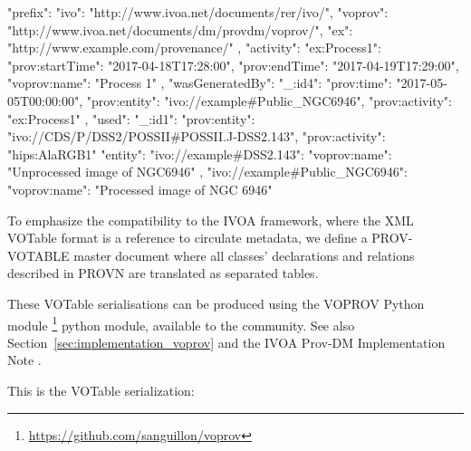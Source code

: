 
\begin{verbnobox}[\scriptsize]
{
  "prefix": {
    "ivo": "http://www.ivoa.net/documents/rer/ivo/",
    "voprov": "http://www.ivoa.net/documents/dm/provdm/voprov/",
    "ex": "http://www.example.com/provenance/"
  },
  "activity": {
    "ex:Process1": {
      "prov:startTime": "2017-04-18T17:28:00",
      "prov:endTime": "2017-04-19T17:29:00",
      "voprov:name": "Process 1"
    }
  },
  "wasGeneratedBy": {
    "_:id4": {
      "prov:time": "2017-05-05T00:00:00",
      "prov:entity": "ivo://example#Public_NGC6946",
      "prov:activity": "ex:Process1"
    }
  },
  "used": {
    "_:id1": {
      "prov:entity": "ivo://CDS/P/DSS2/POSSII#POSSII.J-DSS2.143",
      "prov:activity": "hips:AlaRGB1"
    }
  }
  "entity": {
    "ivo://example#DSS2.143": {
      "voprov:name": "Unprocessed image of NGC6946"
    },
    "ivo://example#Public_NGC6946": {
      "voprov:name": "Processed image of NGC 6946"
    }
  }
}
\end{verbnobox}
To emphasize the compatibility to the IVOA framework, where the XML VOTable format is a reference to circulate metadata, we define a PROV-VOTABLE master document where all classes' declarations and relations described in PROV\-N are translated as separated tables.

These VOTable serialisations can be produced  using  the VOPROV Python module  \footnote{\url{https://github.com/sanguillon/voprov}} python module, available to the community. See also Section~\ref{sec:implementation_voprov} and the IVOA Prov-DM Implementation Note \citep[]{std:ProvenanceImplementationNote}. 

This is the VOTable serialization:

